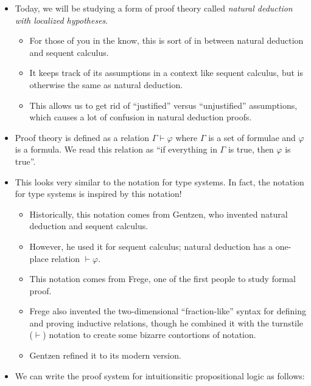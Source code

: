\documentclass{lecturenotes}
\begin{document}
\begin{itemize}
\item Today, we will be studying a form of proof theory called \emph{natural deduction with localized hypotheses}.
  \begin{itemize}
  \item For those of you in the know, this is sort of in between natural deduction and sequent calculus.
  \item It keeps track of its assumptions in a context like sequent calculus, but is otherwise the same as natural deduction.
  \item This allows us to get rid of ``justified'' versus ``unjustified'' assumptions, which causes a lot of confusion in natural deduction proofs.
  \end{itemize}
\item Proof theory is defined as a relation $\Gamma \vdash \varphi$ where $\Gamma$ is a set of formulae and $\varphi$ is a formula.
  We read this relation as ``if everything in $\Gamma$ is true, then $\varphi$ is true''.
\item This looks very similar to the notation for type systems.
  In fact, the notation for type systems is inspired by this notation!
  \begin{itemize}
  \item Historically, this notation comes from Gentzen, who invented natural deduction and sequent calculus.
  \item However, he used it for sequent calculus; natural deduction has a one-place relation $\vdash \varphi$.
  \item This notation comes from Frege, one of the first people to study formal proof.
  \item Frege also invented the two-dimensional ``fraction-like'' syntax for defining and proving inductive relations, though he  combined it with the turnstile ($\vdash$) notation to create some bizarre contortions of notation.
  \item Gentzen refined it to its modern version.
  \end{itemize}
\item We can write the proof system for intuitionsitic propositional logic as follows:
\end{itemize}
\end{document}

